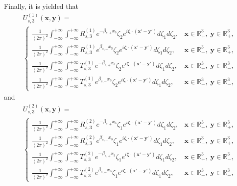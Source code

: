 \documentclass[final,reqno]{siamltex}
\newcommand{\mat}{\mathbb}
\newcommand{\R}{{\mat R}}
\begin{document}
Finally, it is yielded that 
\begin{align*}
&U_{s,3}^{(1)}(\mathbf{x},\mathbf{y})=\\
&\left\{
\begin{array}{ll}
	\displaystyle\frac{1}{(2\pi)^2}\int_{-\infty}^{+\infty}\int_{-\infty}^{+\infty}R_{s,3}^{(1)}e^{-\beta_{s,+}x_3}\zeta_2e^{i\boldsymbol{\zeta}\cdot(\mathbf{x}'-\mathbf{y}')}d\zeta_1d\zeta_2,&\mathbf{x}\in\R^3_+,\;\mathbf{y}\in\R^3_+,\\
	\displaystyle\frac{1}{(2\pi)^2}\int_{-\infty}^{+\infty}\int_{-\infty}^{+\infty}R_{s,3}^{(1)}e^{\beta_{s,-}x_3}\zeta_2e^{i\boldsymbol{\zeta}\cdot(\mathbf{x}'-\mathbf{y}')}d\zeta_1d\zeta_2,&\mathbf{x}\in\R^3_-,\;\mathbf{y}\in\R^3_+, \\
	\displaystyle\frac{1}{(2\pi)^2}\int_{-\infty}^{+\infty}\int_{-\infty}^{+\infty}T_{s,3}^{(1)}e^{-\beta_{s,+}x_3}\zeta_2e^{i\boldsymbol{\zeta}\cdot(\mathbf{x}'-\mathbf{y}')}d\zeta_1d\zeta_2,&\mathbf{x}\in\R^3_+,\;\mathbf{y}\in\R^3_-, \\
	\displaystyle\frac{1}{(2\pi)^2}\int_{-\infty}^{+\infty}\int_{-\infty}^{+\infty}T_{s,3}^{(1)}e^{\beta_{s,-}x_3}\zeta_2e^{i\boldsymbol{\zeta}\cdot(\mathbf{x}'-\mathbf{y}')}d\zeta_1d\zeta_2,&\mathbf{x}\in\R^3_-,\;\mathbf{y}\in\R^3_-, 
\end{array}
\right.
\end{align*}
and 
\begin{align*}
&U_{s,3}^{(2)}(\mathbf{x},\mathbf{y})=\\
&\left\{
\begin{array}{ll}
	\displaystyle\frac{1}{(2\pi)^2}\int_{-\infty}^{+\infty}\int_{-\infty}^{+\infty}R_{s,3}^{(2)}e^{-\beta_{s,+}x_3}\zeta_1e^{i\boldsymbol{\zeta}\cdot(\mathbf{x}'-\mathbf{y}')}d\zeta_1d\zeta_2,&\mathbf{x}\in\R^3_+,\;\mathbf{y}\in\R^3_+,\\
	\displaystyle\frac{1}{(2\pi)^2}\int_{-\infty}^{+\infty}\int_{-\infty}^{+\infty}R_{s,3}^{(2)}e^{\beta_{s,-}x_3}\zeta_1e^{i\boldsymbol{\zeta}\cdot(\mathbf{x}'-\mathbf{y}')}d\zeta_1d\zeta_2,&\mathbf{x}\in\R^3_-,\;\mathbf{y}\in\R^3_+, \\
	\displaystyle\frac{1}{(2\pi)^2}\int_{-\infty}^{+\infty}\int_{-\infty}^{+\infty}T_{s,3}^{(2)}e^{-\beta_{s,+}x_3}\zeta_1e^{i\boldsymbol{\zeta}\cdot(\mathbf{x}'-\mathbf{y}')}d\zeta_1d\zeta_2,&\mathbf{x}\in\R^3_+,\;\mathbf{y}\in\R^3_-, \\
	\displaystyle\frac{1}{(2\pi)^2}\int_{-\infty}^{+\infty}\int_{-\infty}^{+\infty}T_{s,3}^{(2)}e^{\beta_{s,-}x_3}\zeta_1e^{i\boldsymbol{\zeta}\cdot(\mathbf{x}'-\mathbf{y}')}d\zeta_1d\zeta_2,&\mathbf{x}\in\R^3_-,\;\mathbf{y}\in\R^3_-, 
\end{array}
\right.
\end{align*}
\end{document}
